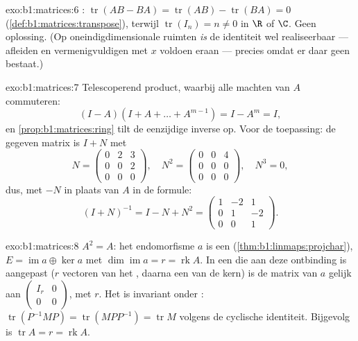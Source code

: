 \begin{solution}{exo:b1:matrices:6}
: $\operatorname{tr}(AB - BA) = \operatorname{tr}(AB) -
\operatorname{tr}(BA) = 0$ (\cref{def:b1:matrices:transpose}),
terwijl $\operatorname{tr}(I_n) = n \neq 0$ in $\R$ of $\C$. Geen
oplossing. (Op oneindigdimensionale ruimten \emph{is} de
identiteit wel realiseerbaar --- afleiden en vermenigvuldigen met
$x$ voldoen eraan --- precies omdat er daar geen  bestaat.)
\end{solution}

\begin{solution}{exo:b1:matrices:7}
Telescoperend product, waarbij alle machten van $A$ commuteren:
\[
(I - A)(I + A + \dots + A^{m-1}) = I - A^m = I ,
\]
en \cref{prop:b1:matrices:ring} tilt de eenzijdige inverse op. Voor
de toepassing: de gegeven matrix is $I + N$ met
\[
N = \begin{pmatrix} 0 & 2 & 3\\ 0 & 0 & 2\\ 0&0&0 \end{pmatrix},
\quad
N^2 = \begin{pmatrix} 0&0&4\\ 0&0&0\\ 0&0&0\end{pmatrix},
\quad N^3 = 0 ,
\]
dus, met $-N$ in plaats van $A$ in de formule:
\[
(I + N)^{-1} = I - N + N^2 =
\begin{pmatrix}
1 & -2 & 1\\
0 & 1 & -2\\
0 & 0 & 1
\end{pmatrix}.
\]
\end{solution}

\begin{solution}{exo:b1:matrices:8}
$A^2 = A$: het endomorfisme $a$ is een 
(\cref{thm:b1:linmaps:projchar}), $E = \operatorname{im} a \oplus
\ker a$ met $\dim\operatorname{im} a = r = \operatorname{rk} A$. In
een  die aan deze ontbinding is aangepast ($r$ vectoren van
het , daarna een  van de kern) is de matrix van $a$ gelijk
aan $\begin{pmatrix} I_r & 0\\ 0 & 0\end{pmatrix}$, met  $r$.
Het  is invariant onder :
$\operatorname{tr}(P^{-1}MP) = \operatorname{tr}(MPP^{-1}) =
\operatorname{tr} M$ volgens de cyclische identiteit. Bijgevolg is
$\operatorname{tr} A = r = \operatorname{rk} A$.
\end{solution}

